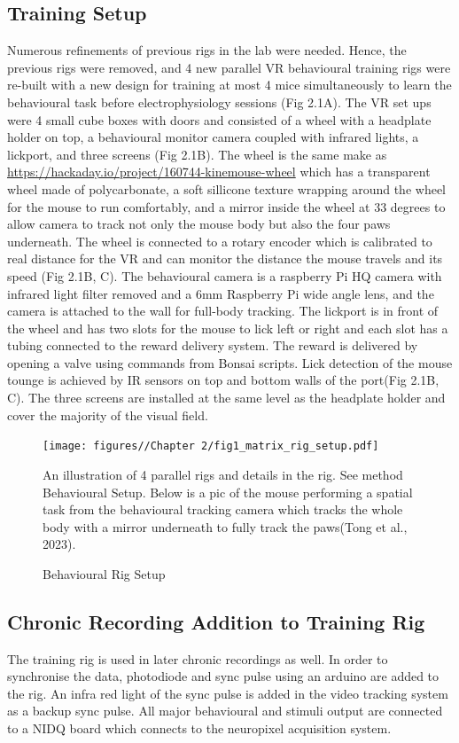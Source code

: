\subsection{Training Setup}
Numerous refinements of previous rigs in the lab were needed. Hence, the previous rigs were removed, and 4 new parallel VR behavioural training rigs were re-built with a new design for training at most 4 mice simultaneously to learn the behavioural task before electrophysiology sessions (Fig 2.1A). The VR set ups were 4 small cube boxes with doors and consisted of a wheel with a headplate holder on top, a behavioural monitor camera coupled with infrared lights, a lickport, and three screens (Fig 2.1B). The wheel is the same make as \href{https://hackaday.io/project/160744-kinemouse-wheel}{https://hackaday.io/project/160744-kinemouse-wheel} which has a transparent wheel made of polycarbonate, a soft sillicone texture wrapping around the wheel for the mouse to run comfortably, and a mirror inside the wheel at 33 degrees to allow camera to track not only the mouse body but also the four paws underneath. The wheel is connected to a rotary encoder which is calibrated to real distance for the VR and can monitor the distance the mouse travels and its speed (Fig 2.1B, C). The behavioural camera is a raspberry Pi HQ camera with infrared light filter removed and a 6mm Raspberry Pi wide angle lens, and the camera is attached to the wall for full-body tracking. The lickport is in front of the wheel and has two slots for the mouse to lick left or right and each slot has a tubing connected to the reward delivery system. The reward is delivered by opening a valve using commands from Bonsai scripts. Lick detection of the mouse tounge is achieved by IR sensors on top and bottom walls of the port(Fig 2.1B, C). The three screens are installed at the same level as the headplate holder and cover the majority of the visual field.
\begin{figure}
    \centering
    \texttt{[image: figures//Chapter 2/fig1\_matrix\_rig\_setup.pdf]}
    \caption{Behavioural Rig Setup}
An illustration of 4 parallel rigs and details in the rig. See method Behavioural Setup. Below is a pic of the mouse performing a spatial task from the behavioural tracking camera which tracks the whole body with a mirror underneath to fully track the paws(Tong et al., 2023).  
    \label{fig:placeholder}
\end{figure}

\subsection{Chronic Recording Addition to Training Rig}
The training rig is used in later chronic recordings as well. In order to synchronise the data, photodiode and sync pulse using an arduino are added to the rig. An infra red light of the sync pulse is added in the video tracking system as a backup sync pulse. All major behavioural and stimuli output are connected to a NIDQ board which connects to the neuropixel acquisition system.

